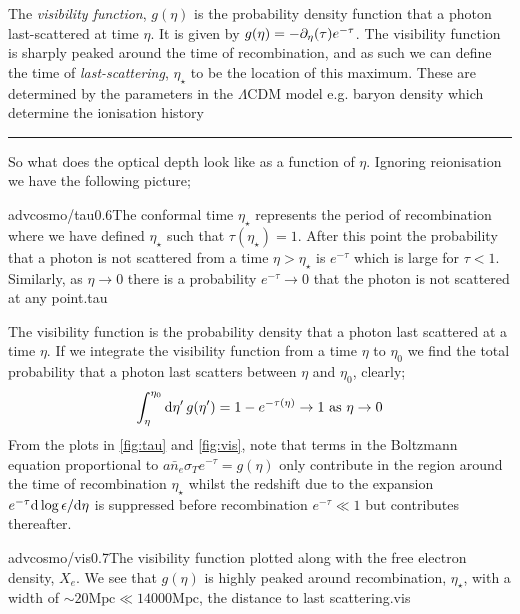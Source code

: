 \paraskip
The \emph{visibility function}, $g(\eta)$ is the probability density function that a photon last-scattered at time $\eta$. It is given by $g(\eta) = -\partial_\eta(\tau)e^{-\tau}$. The visibility function is sharply peaked around the time of recombination, and as such we can define the time of \emph{last-scattering}, $\eta_{\star}$ to be the location of this maximum. These are determined by the parameters in the $\Lambda$CDM model e.g. baryon density which determine the ionisation history
\vspace{10pt}\hrule\vspace{10pt}
So what does the optical depth look like as a function of $\eta$. Ignoring reionisation we have the following picture;
\begin{mygraphic}{advcosmo/tau}{0.6}{The conformal time $\eta_{\star}$ represents the period of recombination where we have defined $\eta_\star$ such that $\tau(\eta_\star) = 1$. After this point the probability that a photon is not scattered from a time $\eta > \eta_\star$ is $e^{-\tau}$ which is large for $\tau < 1$. Similarly, as $\eta \rightarrow 0$ there is a probability $e^{-\tau}\rightarrow 0$ that the photon is not scattered at any point.}{tau}\end{mygraphic}
The visibility function is the probability density that a photon last scattered at a time $\eta$. If we integrate the visibility function from a time $\eta$ to $\eta_0$ we find the total probability that a photon last scatters between $\eta$ and $\eta_0$, clearly;
\begin{equation*}
\int_\eta^{\eta_0}{\text{d}\eta^{\prime} \,g(\eta^{\prime})} = 1 - e^{-\tau(\eta)} \rightarrow 1 \,\,\text{as}\,\,\eta \rightarrow 0
\end{equation*}
From the plots in \autoref{fig:tau} and \autoref{fig:vis}, note that terms in the Boltzmann equation proportional to $a\bar{n}_e \sigma_T e^{-\tau} = g(\eta)$ only contribute in the region around the time of recombination $\eta_\star$ whilst the redshift due to the expansion $e^{-\tau}\text{d} \log\epsilon / \text{d} \eta$ is suppressed before recombination $e^{-\tau} \ll 1$ but contributes thereafter.
\begin{mygraphic}{advcosmo/vis}{0.7}{The visibility function plotted along with the free electron density, $X_e$. We see that $g(\eta)$ is highly peaked around recombination, $\eta_\star$, with a width of $\sim 20\text{Mpc} \ll 14000\text{Mpc}$, the distance to last scattering.}{vis}\end{mygraphic}
